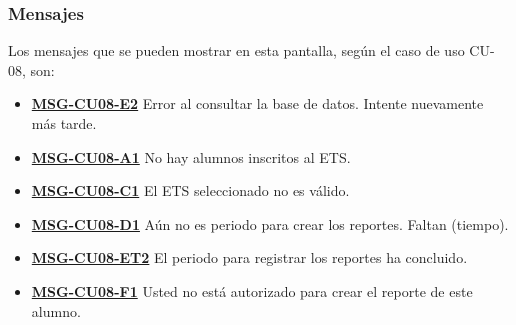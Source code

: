\subsubsection{Mensajes}
Los mensajes que se pueden mostrar en esta pantalla, según el caso de uso CU-08, son:
\begin{itemize}
	\item \textbf{\hyperref[msg:CU08-E2]{MSG-CU08-E2}} Error al consultar la base de datos. Intente nuevamente más tarde.
	\item \textbf{\hyperref[msg:CU08-A1]{MSG-CU08-A1}} No hay alumnos inscritos al ETS.
	\item \textbf{\hyperref[msg:CU08-C1]{MSG-CU08-C1}} El ETS seleccionado no es válido.
	\item \textbf{\hyperref[msg:CU08-D1]{MSG-CU08-D1}} Aún no es periodo para crear los reportes. Faltan (tiempo).
	\item \textbf{\hyperref[msg:CU08-ET2]{MSG-CU08-ET2}} El periodo para registrar los reportes ha concluido.
	\item \textbf{\hyperref[msg:CU08-F1]{MSG-CU08-F1}} Usted no está autorizado para crear el reporte de este alumno.
\end{itemize}